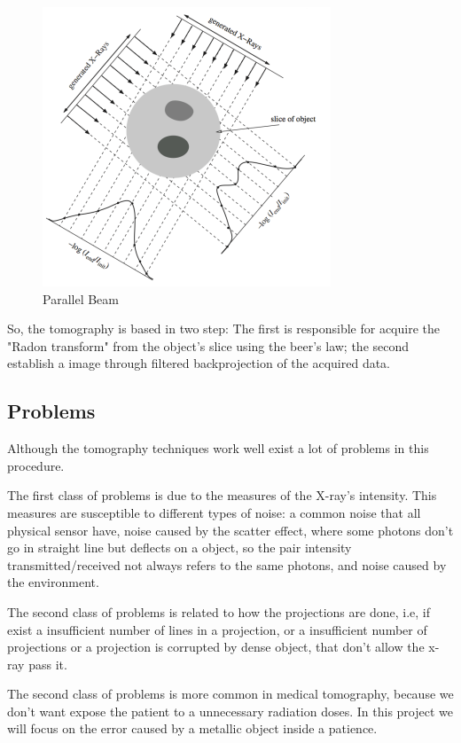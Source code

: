 \begin{figure}[h]
\centering
\includegraphics[scale=0.8]{img/TAC}
\caption{{Parallel Beam}}\label{tac_bean}
\end{figure}

So, the tomography is based in two step: The first is responsible for acquire the "Radon transform" from the object's slice using the beer's law; the second establish a image through filtered backprojection of the acquired data.

\subsection{Problems}

Although the tomography techniques work well exist a lot of problems in this procedure.

The first class of problems is due to the measures of the X-ray's intensity. This measures are susceptible to different types of noise: a common noise that all physical sensor have, noise caused by the scatter effect, where some photons don't go in straight line but deflects on a object, so the pair intensity transmitted/received not always refers to the same photons, and noise caused by the environment.

The second class of problems is related to how the projections are done, i.e, if exist a insufficient number of lines in a projection, or a insufficient number of projections or a projection is corrupted by dense object, that don't allow the x-ray pass it.  

The second class of problems is more common in medical tomography, because we don't want expose the patient to a unnecessary radiation doses.
In this project we will focus on the error caused by a metallic object inside a patience. 


